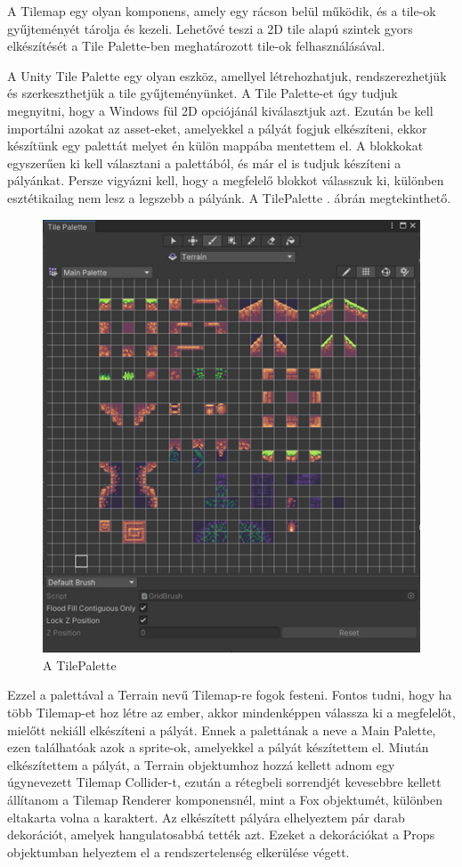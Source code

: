 A Tilemap egy olyan komponens, amely egy rácson belül működik, és a tile-ok gyűjteményét tárolja és kezeli. Lehetővé teszi a 2D tile alapú szintek gyors elkészítését a Tile Palette-ben meghatározott tile-ok felhasználásával.\cite{unitytilemap}

A Unity Tile Palette egy olyan eszköz, amellyel létrehozhatjuk, rendszerezhetjük és szerkeszthetjük a tile gyűjteményünket. A Tile Palette-et úgy tudjuk megnyitni, hogy a Windows fül 2D opciójánál kiválasztjuk azt. Ezután be kell importálni azokat az asset-eket, amelyekkel a pályát fogjuk elkészíteni, ekkor készítünk egy palettát melyet én külön mappába mentettem el. A blokkokat egyszerűen ki kell választani a palettából, és már el is tudjuk készíteni a pályánkat. Persze vigyázni kell, hogy a megfelelő blokkot válasszuk ki, különben esztétikailag nem lesz a legszebb a pályánk.  A TilePalette . ábrán megtekinthető.

\begin{figure}[ht]
\centering
\includegraphics[scale = 0.8]{images/tilepalette.png}
\caption{A TilePalette}
\label{fig:tilepalette}
\end{figure}

Ezzel a palettával a Terrain nevű Tilemap-re fogok festeni. Fontos tudni, hogy ha több Tilemap-et hoz létre az ember, akkor mindenképpen válassza ki a megfelelőt, mielőtt nekiáll elkészíteni a pályát. Ennek a palettának a neve a Main Palette, ezen találhatóak azok a sprite-ok, amelyekkel a pályát készítettem el. Miután elkészítettem a pályát, a Terrain objektumhoz hozzá kellett adnom egy úgynevezett Tilemap Collider-t, ezután a rétegbeli sorrendjét kevesebbre kellett állítanom a Tilemap Renderer komponensnél, mint a Fox objektumét, különben eltakarta volna a karaktert. Az elkészített pályára elhelyeztem pár darab dekorációt, amelyek hangulatosabbá tették azt. Ezeket a dekorációkat a Props objektumban helyeztem el a rendszertelenség elkerülése végett.

